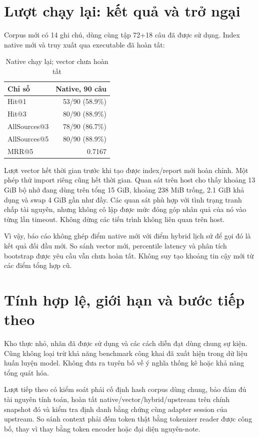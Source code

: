 \documentclass[conference]{IEEEtran}
\begin{document}
\section{Lượt chạy lại: kết quả và trở ngại}
Corpus mới có 14 ghi chú, dùng cùng tập 72+18 câu đã được sử dụng. Index native mới và truy xuất qua executable đã hoàn tất:
\begin{table}[h]
\caption{Native chạy lại; vector chưa hoàn tất}
\centering\small
\begin{tabular}{@{}lr@{}}
\toprule
Chỉ số & Native, 90 câu \\
\midrule
Hit@1 & 53/90 (58.9\%) \\
Hit@3 & 80/90 (88.9\%) \\
AllSources@3 & 78/90 (86.7\%) \\
AllSources@5 & 80/90 (88.9\%) \\
MRR@5 & 0.7167 \\
\bottomrule
\end{tabular}
\end{table}

Lượt vector hết thời gian trước khi tạo được index/report mới hoàn chỉnh. Một phép thử import riêng cũng hết thời gian. Quan sát trên host cho thấy khoảng 13 GiB bộ nhớ đang dùng trên tổng 15 GiB, khoảng 238 MiB trống, 2.1 GiB khả dụng và swap 4 GiB gần như đầy. Các quan sát phù hợp với tình trạng tranh chấp tài nguyên, nhưng không cô lập được mức đóng góp nhân quả của nó vào từng lần timeout. Không dừng các tiến trình không liên quan trên host.

Vì vậy, báo cáo không ghép điểm native mới với điểm hybrid lịch sử để gọi đó là kết quả đối đầu mới. So sánh vector mới, percentile latency và phân tích bootstrap được yêu cầu vẫn chưa hoàn tất. Không suy tạo khoảng tin cậy mới từ các điểm tổng hợp cũ.

\section{Tính hợp lệ, giới hạn và bước tiếp theo}
Kho thực nhỏ, nhãn đã được sử dụng và các cách diễn đạt dùng chung sự kiện. Cũng không loại trừ khả năng benchmark công khai đã xuất hiện trong dữ liệu huấn luyện model. Không đưa ra tuyên bố về ý nghĩa thống kê hoặc khả năng tổng quát hóa.

Lượt tiếp theo có kiểm soát phải cố định hash corpus dùng chung, bảo đảm đủ tài nguyên tính toán, hoàn tất native/vector/hybrid/upstream trên chính snapshot đó và kiểm tra định danh bằng chứng cùng adapter session của upstream. So sánh context phải đếm token thật bằng tokenizer reader được công bố, thay vì thay bằng token encoder hoặc đại diện nguyên-note.
\end{document}
